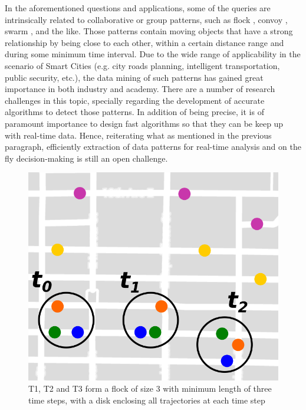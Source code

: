 In the aforementioned questions and applications, some of the queries are intrinsically related to collaborative or
group patterns, such as flock \citep{gudefficient}, convoy \citep{convoy}, swarm \citep{swarm}, and the like. Those
patterns contain moving objects that have a strong relationship by being close to each other, within a certain distance
range and during some minimum time interval. Due to the wide range of applicability in the scenario of Smart Cities
(e.g. city roads planning, intelligent transportation, public security, etc.), the data mining of such patterns has
gained great importance in both industry and academy. There are a number of research challenges in this topic, specially
regarding the development of accurate algorithms to detect those patterns. In addition of being precise, it is of
paramount importance to design fast algorithms so that they can be keep up with real-time data. Hence, reiterating what
as mentioned in the previous paragraph, efficiently extraction of data patterns for real-time analysis and on the fly
decision-making is still an open challenge.
%
%

\begin{figure}[h!]
    \centering
    \includegraphics[width=0.7\linewidth]{images/flock_pattern.png}
    \caption{T1, T2 and T3 form a flock of size 3 with minimum length of three time steps, with a disk enclosing all
        trajectories at each time step}
    \label{fig:flocks}
\end{figure}

